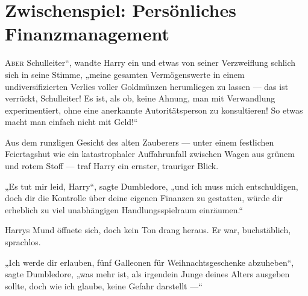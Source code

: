 \chapter{Zwischenspiel: Persönliches Finanzmanagement}
\lettrine[ante=„]{A}{ber} Schulleiter“, wandte Harry ein und etwas von seiner Verzweiflung schlich sich in seine Stimme, „meine gesamten Vermögenswerte in einem undiversifizierten Verlies voller Goldmünzen herumliegen zu lassen — das ist verrückt, Schulleiter! Es ist, als ob, keine Ahnung, man mit Verwandlung experimentiert, ohne eine anerkannte Autoritätsperson zu konsultieren! So etwas macht man einfach nicht mit Geld!“

Aus dem runzligen Gesicht des alten Zauberers — unter einem festlichen Feiertagshut wie ein katastrophaler Auffahrunfall zwischen Wagen aus grünem und rotem Stoff — traf Harry ein ernster, trauriger Blick.

„Es tut mir leid, Harry“, sagte Dumbledore, „und ich muss mich entschuldigen, doch dir die Kontrolle über deine eigenen Finanzen zu gestatten, würde dir erheblich zu viel unabhängigen Handlungsspielraum einräumen.“

Harrys Mund öffnete sich, doch kein Ton drang heraus. Er war, buchstäblich, sprachlos.

„Ich werde dir erlauben, fünf Galleonen für Weihnachtsgeschenke abzuheben“, sagte Dumbledore, „was mehr ist, als irgendein Junge deines Alters ausgeben sollte, doch wie ich glaube, keine Gefahr darstellt —“

